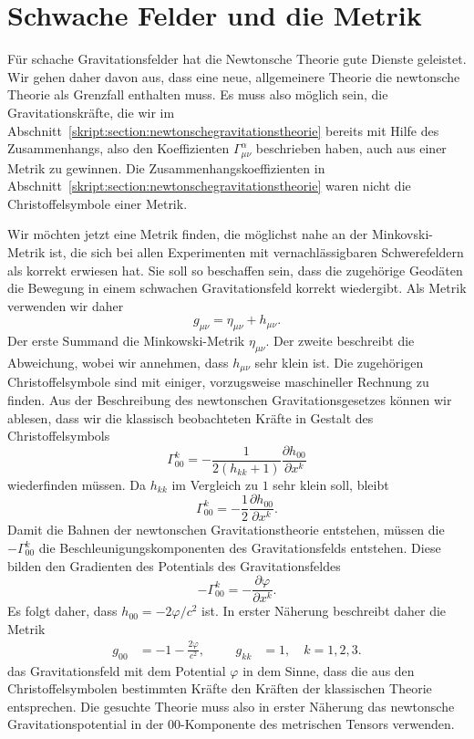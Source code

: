\section{Schwache Felder und die Metrik}
Für schache Gravitationsfelder hat die Newtonsche Theorie gute Dienste
geleistet. 
Wir gehen daher davon aus, dass eine neue, allgemeinere Theorie die
newtonsche Theorie als Grenzfall enthalten muss.
Es muss also möglich sein, die Gravitationskräfte, die wir im 
Abschnitt~\ref{skript:section:newtonschegravitationstheorie} bereits
mit Hilfe des Zusammenhangs, also den Koeffizienten $\Gamma^\alpha_{\mu\nu}$
beschrieben haben, auch aus einer Metrik zu gewinnen.
Die Zusammenhangskoeffizienten in
Abschnitt~\ref{skript:section:newtonschegravitationstheorie} waren nicht
die Christoffelsymbole einer Metrik.

Wir möchten jetzt eine Metrik finden, die möglichst nahe an der
Minkovski-Metrik ist, die sich bei allen Experimenten mit
vernachlässigbaren Schwerefeldern als korrekt erwiesen hat.
Sie soll so beschaffen sein, dass die zugehörige Geodäten die
Bewegung in einem schwachen Gravitationsfeld korrekt wiedergibt.
Als Metrik verwenden wir daher
\[
g_{\mu\nu}=\eta_{\mu\nu} + h_{\mu\nu}.
\]
Der erste Summand die Minkowski-Metrik $\eta_{\mu\nu}$.
Der zweite beschreibt die Abweichung, wobei wir annehmen,
dass $h_{\mu\nu}$ sehr klein ist.
Die zugehörigen Christoffelsymbole sind mit einiger, vorzugsweise
maschineller Rechnung zu finden.
Aus der Beschreibung des newtonschen Gravitationsgesetzes können wir
ablesen, dass wir die klassisch beobachteten Kräfte in Gestalt
des Christoffelsymbols
\[
\Gamma^{k}_{00}
=
-\frac{1}{2(h_{kk} + 1)}\frac{\partial h_{00}}{\partial x^k}
\]
wiederfinden müssen.
Da $h_{kk}$ im Vergleich zu $1$ sehr klein soll, bleibt
\[
\Gamma^{k}_{00}
=
-\frac{1}{2}\frac{\partial h_{00}}{\partial x^k}.
\]
Damit die Bahnen der newtonschen Gravitationstheorie entstehen, müssen
die $-\Gamma^k_{00}$ die Beschleunigungskomponenten des Gravitationsfelds
entstehen.
Diese bilden den Gradienten des Potentials des Gravitationsfeldes
\[
-\Gamma^k_{00} = -\frac{\partial\varphi}{\partial x^k}.
\]
Es folgt daher, dass $h_{00}=-2\varphi/c^2$ ist.
In erster Näherung beschreibt daher die Metrik
\begin{equation}
\begin{aligned}
g_{00} &= -1 -\frac{2\varphi}{c^2},
&&&
g_{kk} &= 1,\quad k=1,2,3.
\end{aligned}
\label{skript:gravitation:naeherung}
\end{equation}
das Gravitationsfeld mit dem Potential $\varphi$ in dem Sinne, dass
die aus den Christoffelsymbolen bestimmten Kräfte den Kräften der
klassischen Theorie entsprechen.
Die gesuchte Theorie muss also in erster Näherung das newtonsche
Gravitationspotential in der $00$-Komponente des metrischen Tensors
verwenden.

